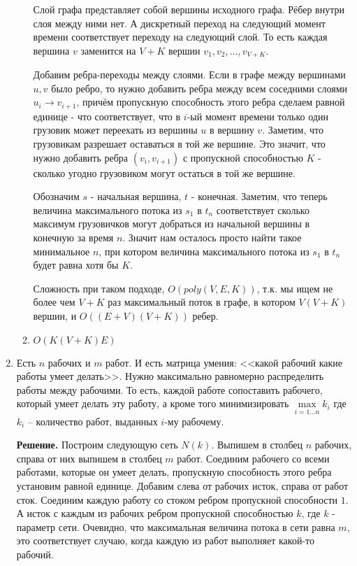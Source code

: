 \begin{enumerate}
\begin{enumerate}
		Слой графа представляет собой вершины исходного графа. Рёбер внутри слоя между ними нет. А дискретный 
		переход на следующий момент времени соответствует переходу на следующий слой. То есть каждая вершина $v$ 
		заменится на $V + K$ вершин $v_1, v_2, ..., v_{V + K}$. 
		
		Добавим ребра-переходы между слоями. Если в графе между вершинами $u, v$ было ребро, то нужно добавить 
		ребра между всем соседними слоями $u_{i} \to v_{i + 1}$, причём пропускную способность этого ребра 
		сделаем равной единице - что соответствует, что в $i$-ый момент времени только один грузовик может 
		переехать из вершины $u$ в вершину $v$. Заметим, что грузовикам разрешает оставаться в той же вершине. 
		Это значит, что нужно добавить ребра $(v_i, v_{i + 1})$ с пропускной способностью $K$ - сколько угодно 
		грузовиком могут остаться в той же вершине.
		
		Обозначим $s$ - начальная вершина, $t$ - конечная. Заметим, что теперь величина максимального потока из 
		$s_1$ в $t_n$ соответствует сколько максимум грузовичков могут добраться из начальной вершины в конечную 
		за время $n$. Значит нам осталось просто найти такое минимальное $n$, при котором величина максимального 
		потока из $s_1$ в $t_n$ будет равна хотя бы $K$. 
		
		Сложность при таком подходе, $O(poly(V, E, K))$, т.к. мы ищем не более чем $V + K$ раз максимальный поток 
		в графе, в котором $V(V + K)$ вершин, и $O((E + V)(V + K))$ ребер.
		\item $O(K(V + K)E)$
	\end{enumerate}
	
	\item Есть $n$ рабочих и $m$ работ. И есть матрица умения: <<какой рабочий какие работы умеет делать>>. Нужно 
	максимально равномерно распределить работы между рабочими. То есть, каждой работе сопоставить рабочего, который 
	умеет делать эту работу, а кроме того минимизировать $\max\limits_{i=1\dots n} k_i$ где $k_i$ – количество 
	работ, выданных $i$-му рабочему.
	
	\textbf{Решение.} Построим следующую сеть $N(k)$. Выпишем в столбец $n$ рабочих, справа от них выпишем в 
	столбец $m$ работ. Соединим рабочего со всеми работами, которые он умеет делать, пропускную способность 
	этого ребра установим равной единице. Добавим слева от рабочих исток, справа от работ сток. Соединим каждую 
	работу со стоком ребром пропускной способности $1$. А исток с каждым из рабочих ребром пропускной 
	способностью $k$, где $k$ - параметр сети. Очевидно, что максимальная величина потока в сети равна $m$, это 
	соответствует случаю, когда каждую из работ выполняет какой-то рабочий.
	

\end{enumerate}
